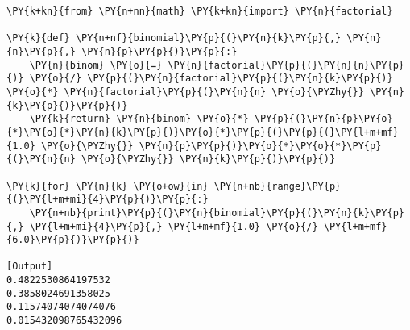 \begin{Verbatim}[label=\makebox{\href{https://bitbucket.org/lbaldini/statnotes/src/master/snippets/binomial.py}{https://bitbucket.org/.../binomial.py}},commandchars=\\\{\}]
\PY{k+kn}{from} \PY{n+nn}{math} \PY{k+kn}{import} \PY{n}{factorial}

\PY{k}{def} \PY{n+nf}{binomial}\PY{p}{(}\PY{n}{k}\PY{p}{,} \PY{n}{n}\PY{p}{,} \PY{n}{p}\PY{p}{)}\PY{p}{:}
    \PY{n}{binom} \PY{o}{=} \PY{n}{factorial}\PY{p}{(}\PY{n}{n}\PY{p}{)} \PY{o}{/} \PY{p}{(}\PY{n}{factorial}\PY{p}{(}\PY{n}{k}\PY{p}{)} \PY{o}{*} \PY{n}{factorial}\PY{p}{(}\PY{n}{n} \PY{o}{\PYZhy{}} \PY{n}{k}\PY{p}{)}\PY{p}{)}
    \PY{k}{return} \PY{n}{binom} \PY{o}{*} \PY{p}{(}\PY{n}{p}\PY{o}{*}\PY{o}{*}\PY{n}{k}\PY{p}{)}\PY{o}{*}\PY{p}{(}\PY{p}{(}\PY{l+m+mf}{1.0} \PY{o}{\PYZhy{}} \PY{n}{p}\PY{p}{)}\PY{o}{*}\PY{o}{*}\PY{p}{(}\PY{n}{n} \PY{o}{\PYZhy{}} \PY{n}{k}\PY{p}{)}\PY{p}{)}

\PY{k}{for} \PY{n}{k} \PY{o+ow}{in} \PY{n+nb}{range}\PY{p}{(}\PY{l+m+mi}{4}\PY{p}{)}\PY{p}{:}
    \PY{n+nb}{print}\PY{p}{(}\PY{n}{binomial}\PY{p}{(}\PY{n}{k}\PY{p}{,} \PY{l+m+mi}{4}\PY{p}{,} \PY{l+m+mf}{1.0} \PY{o}{/} \PY{l+m+mf}{6.0}\PY{p}{)}\PY{p}{)}

[Output]
0.4822530864197532
0.3858024691358025
0.11574074074074076
0.015432098765432096
\end{Verbatim}